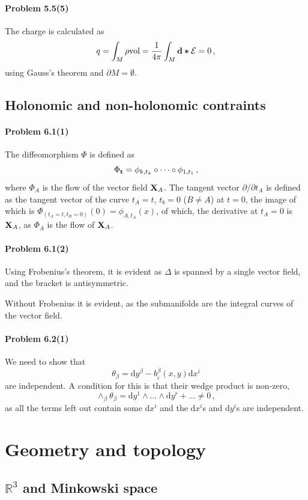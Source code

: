\documentclass[a4paper,12pt]{article}
\def\d{\mathrm{d}}
\newcommand{\problem}[1]{\paragraph{Problem #1}}
\begin{document}

\problem{5.5(5)} The charge is calculated as
\[
 q=\int_M \rho{\rm vol} = \frac{1}{4\pi}\int_M {\bf d}\boldsymbol{*}\mathcal{E} = 0\,,
\]
using Gauss's theorem and $\partial M=\emptyset$.


\subsection{Holonomic and non-holonomic contraints}


\problem{6.1(1)} The diffeomorphism $\Phi$ is defined as
\[
 \Phi_{\bf t} = \phi_{k,t_k}\circ\dots\circ\phi_{1,t_1}\,,
\]
where $\Phi_A$ is the flow of the vector field ${\bf X}_A$. The tangent vector $\partial/\partial t_A$ is defined as the tangent vector of the curve $t_A=t$, $t_b=0$ ($B\ne A$) at $t=0$, the image of which is $\Phi_(t_A=t, t_B=0)(0) = \phi_{A,t_A}(x)$, of which, the derivative at $t_A=0$ is ${\bf X}_A$, as $\Phi_A$ is the flow of ${\bf X}_A$.


\problem{6.1(2)} Using Frobenius's theorem, it is evident as $\Delta$ is spanned by a single vector field, and the bracket is antisymmetric.

Without Frobenius it is evident, as the submanifolds are the integral curves of the vector field.


\problem{6.2(1)} We need to show that
\[
 \theta_\beta = \d y^\beta - b^\beta_i(x, y)\d x^i
\]
are independent. A condition for this is that their wedge product is non-zero,
\[
 \wedge_\beta \theta_\beta = \d y^1 \wedge \dots\wedge\d y^r + \dots \ne 0\,,
\]
as all the terms left out contain some $\d x^i$ and the $\d x^i$s and $\d y^i$s are independent.


\section{Geometry and topology}

\subsection{\texorpdfstring{$\mathbb{R}^3$}{R3} and Minkowski space}
\end{document}
